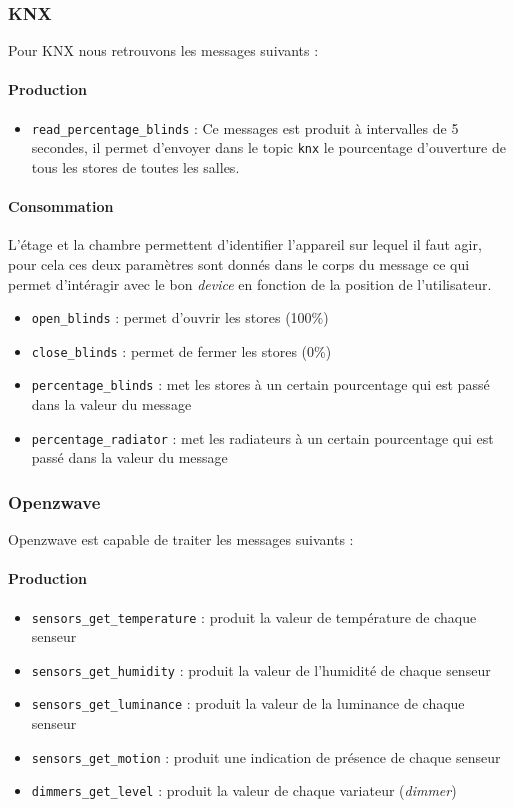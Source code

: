 \subsubsection{KNX}
Pour KNX nous retrouvons les messages suivants : 
\paragraph{Production}
\begin{itemize}
    \item \texttt{read_percentage_blinds} : Ce messages est produit à intervalles de 5 secondes, il permet d'envoyer dans le topic \texttt{knx} le pourcentage d'ouverture de tous les stores de toutes les salles. 
\end{itemize}

\paragraph{Consommation}
L'étage et la chambre permettent d'identifier l'appareil sur lequel il faut agir, pour cela ces deux paramètres sont donnés dans le corps du message ce qui permet d'intéragir avec le bon \textit{device} en fonction de la position de l'utilisateur.
\begin{itemize}
    \item \texttt{open_blinds} : permet d'ouvrir les stores (100\%)
    \item \texttt{close_blinds} : permet de fermer les stores (0\%)
    \item \texttt{percentage_blinds} : met les stores à un certain pourcentage qui est passé dans la valeur du message
    \item \texttt{percentage_radiator} : met les radiateurs à un certain pourcentage qui est passé dans la valeur du message
\end{itemize}

\subsubsection{Openzwave}
Openzwave est capable de traiter les messages suivants : 
\paragraph{Production}
\begin{itemize}
    \item \texttt{sensors_get_temperature} : produit la valeur de température de chaque senseur
    \item \texttt{sensors_get_humidity} : produit la valeur de l'humidité de chaque senseur
    \item \texttt{sensors_get_luminance} : produit la valeur de la luminance de chaque senseur
    \item \texttt{sensors_get_motion} : produit une indication de présence de chaque senseur
    \item \texttt{dimmers_get_level} : produit la valeur de chaque variateur (\textit{dimmer})
\end{itemize}

